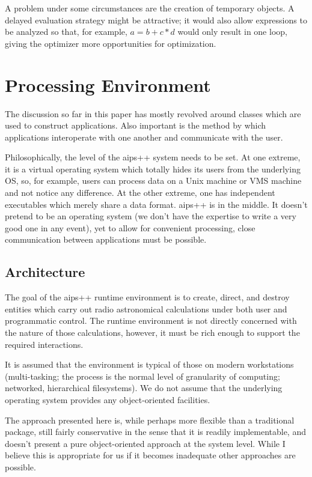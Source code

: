 A problem under some circumstances are the creation of temporary
objects. A delayed evaluation strategy might be attractive; it would
also allow expressions to be analyzed so that, for example, $a = b +
c*d$ would only result in one loop, giving the optimizer more
opportunities for optimization.

\section{Processing Environment}

The discussion so far in this paper has mostly revolved around classes
which are used to construct applications. Also important is the method
by which applications interoperate with one another and communicate
with the user.

Philosophically, the level of the {\sc aips++} system needs to be
set. At one extreme, it is a virtual operating system which totally
hides its users from the underlying OS, so, for example, users can
process data on a Unix machine or VMS machine and not notice any
difference. At the other extreme, one has independent executables
which merely share a data format. {\sc aips++} is in the middle. It
doesn't pretend to be an operating system (we don't have the expertise
to write a very good one in any event), yet to allow for convenient
processing, close communication between applications must be possible.

\subsection{Architecture}

The goal of the {\sc aips++} runtime environment is to create, direct,
and destroy entities which carry out radio astronomical calculations
under both user and programmatic control. The runtime environment is
not directly concerned with the nature of those calculations, however,
it must be rich enough to support the required interactions.

It is assumed that the environment is typical of those on modern
workstations (multi-tasking; the process is the normal level of
granularity of computing; networked, hierarchical filesystems). We do
not assume that the underlying operating system provides any
object-oriented facilities.

The approach presented here is, while perhaps more flexible than a
traditional package, still fairly conservative in the sense that it is
readily implementable, and doesn't present a pure object-oriented
approach at the system level. While I believe this is appropriate for
us if it becomes inadequate other approaches are possible.

